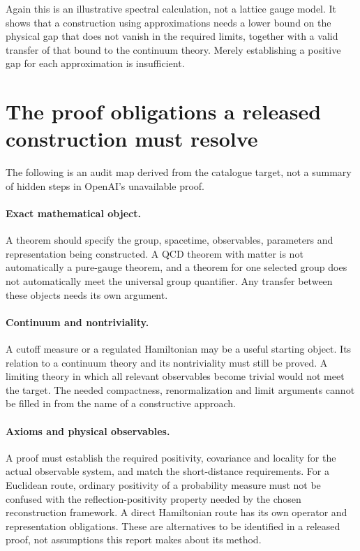 \documentclass[11pt,a4paper]{article}
\numberwithin{equation}{section}
\theoremstyle{definition}
\theoremstyle{remark}
\begin{document}
Again this is an illustrative spectral calculation, not a lattice gauge model.
It shows that a construction using approximations needs a lower bound on the
physical gap that does not vanish in the required limits, together with a valid
transfer of that bound to the continuum theory. Merely establishing a positive
gap for each approximation is insufficient.

\section{The proof obligations a released construction must resolve}
The following is an audit map derived from the catalogue target, not a summary
of hidden steps in OpenAI's unavailable proof.

\paragraph{Exact mathematical object.}
A theorem should specify the group, spacetime, observables, parameters and
representation being constructed. A QCD theorem with matter is not automatically
a pure-gauge theorem, and a theorem for one selected group does not automatically
meet the universal group quantifier. Any transfer between these objects needs
its own argument.

\paragraph{Continuum and nontriviality.}
A cutoff measure or a regulated Hamiltonian may be a useful starting object.
Its relation to a continuum theory and its nontriviality must still be proved.
A limiting theory in which all relevant observables become trivial would not
meet the target. The needed compactness, renormalization and limit arguments
cannot be filled in from the name of a constructive approach.

\paragraph{Axioms and physical observables.}
A proof must establish the required positivity, covariance and locality for the
actual observable system, and match the short-distance requirements. For a
Euclidean route, ordinary positivity of a probability measure must not be
confused with the reflection-positivity property needed by the chosen
reconstruction framework. A direct Hamiltonian route has its own operator and
representation obligations. These are alternatives to be identified in a
released proof, not assumptions this report makes about its method.
\end{document}
